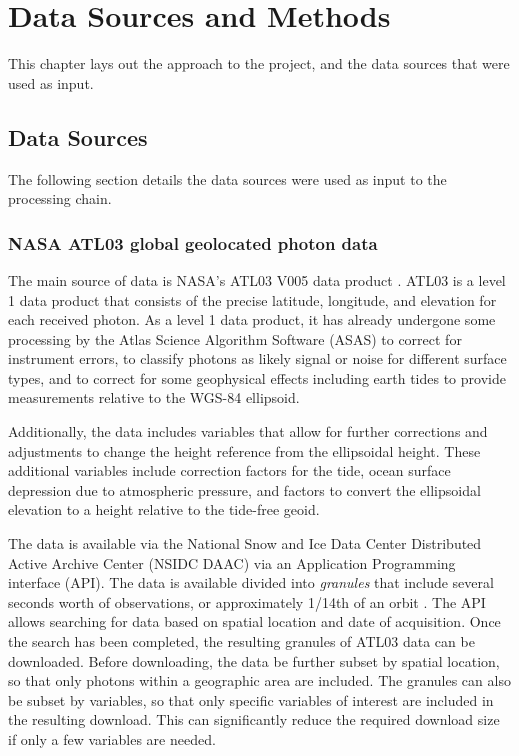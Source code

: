 \chapter{Data Sources and Methods}\label{sec:methodology}
This chapter lays out the approach to the project, and the data sources that were used as input.

\section{Data Sources}

The following section details the data sources were used as input to the processing chain.

\subsection{NASA ATL03 global geolocated photon data}

The main source of data is NASA's ATL03 V005 data product \parencite{icesat2data}. ATL03 is a level 1 data product that consists of the precise latitude, longitude, and elevation for each received photon. As a level 1 data product, it has already undergone some processing by the Atlas Science Algorithm Software (ASAS) to correct for instrument errors, to classify photons as likely signal or noise for different surface types, and to correct for some geophysical effects including earth tides to provide measurements relative to the WGS-84 ellipsoid. 

Additionally, the data includes variables that allow for further corrections and adjustments to change the height reference from the ellipsoidal height. These additional variables include correction factors for the tide, ocean surface depression due to atmospheric pressure, and factors to convert the ellipsoidal elevation to a height relative to the tide-free geoid.

The data is available via the National Snow and Ice Data Center Distributed Active Archive Center (NSIDC DAAC) via an Application Programming interface (API). The data is available divided into \emph{granules} that include several seconds worth of observations, or approximately 1/14th of an orbit \cite{Lu2021}. The API allows searching for data based on spatial location and date of acquisition. Once the search has been completed, the resulting granules of ATL03 data can be downloaded. Before downloading, the data be further subset by spatial location, so that only photons within a geographic area are included. The granules can also be subset by variables, so that only specific variables of interest are included in the resulting download. This can significantly reduce the required download size if only a few variables are needed.


